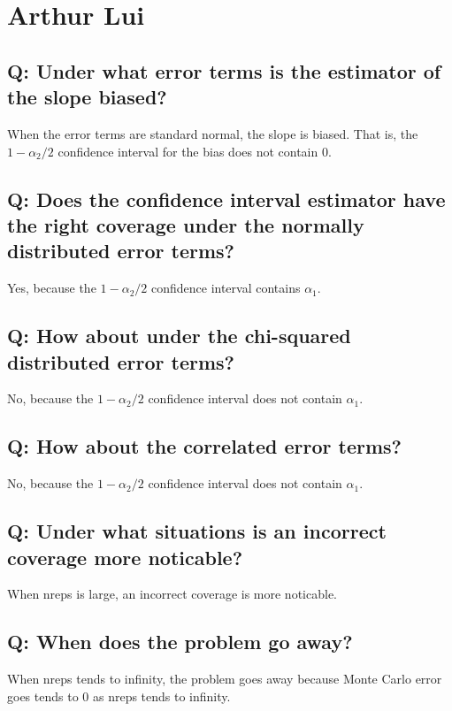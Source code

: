 \documentclass{article}
\begin{document}
\section*{Arthur Lui}

\subsection*{Q: Under what error terms is the estimator of the slope biased?}

When the error terms are standard normal, the slope is biased. That is, the $1 - \alpha_2/2$ confidence interval for the bias does not contain 0.

\subsection*{Q: Does the confidence interval estimator have the right coverage under the normally distributed error terms?}
Yes, because the $1 - \alpha_2/2$  confidence interval contains $\alpha_1$. 


\subsection*{Q: How about under the chi-squared distributed error terms?}
No, because the $1 - \alpha_2/2$  confidence interval does not contain $\alpha_1$. 

\subsection*{Q: How about the correlated error terms?}
No, because the $1 - \alpha_2/2$  confidence interval does not contain $\alpha_1$. 

\subsection*{Q: Under what situations is an incorrect coverage more noticable?}
When nreps is large, an incorrect coverage is more noticable.

\subsection*{Q: When does the problem go away?}
When nreps tends to infinity, the problem goes away because Monte Carlo error goes tends to 0 as nreps tends to infinity.
\end{document}
